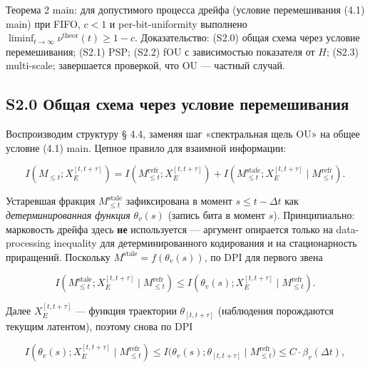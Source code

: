 \documentclass[12pt]{iopart}
\begin{document}
Теорема 2 main: для допустимого процесса дрейфа (условие перемешивания (4.1) main) при FIFO, \(c < 1\) и per-bit-uniformity выполнено \(\liminf_{t\to\infty}\nu^{\text{theor}}(t) \ge 1-c\). Доказательство: (S2.0) общая схема через условие перемешивания; (S2.1) PSP; (S2.2) fOU с зависимостью показателя от \(H\); (S2.3) multi-scale; завершается проверкой, что OU --- частный случай.



\subsection{S2.0 Общая схема через условие перемешивания}\label{s2.0-ux43eux431ux449ux430ux44f-ux441ux445ux435ux43cux430-ux447ux435ux440ux435ux437-ux443ux441ux43bux43eux432ux438ux435-ux43fux435ux440ux435ux43cux435ux448ux438ux432ux430ux43dux438ux44f}



Воспроизводим структуру \cite{Andriishin2026b} § 4.4, заменяя шаг «спектральная щель OU» на общее условие (4.1) main. Цепное правило для взаимной информации:



\begin{equation}I(M_{\le t}; X_E^{[t,t+\tau]}) = I(M_{\le t}^{\text{refr}}; X_E^{[t,t+\tau]}) + I(M_{\le t}^{\text{stale}}; X_E^{[t,t+\tau]}\mid M_{\le t}^{\text{refr}}). \tag{S2.1}\end{equation}



Устаревшая фракция \(M_{\le t}^{\text{stale}}\) зафиксирована в момент \(s \le t-\Delta t\) как \emph{детерминированная функция} \(\theta_v(s)\) (запись бита в момент \(s\)). Принципиально: марковость дрейфа здесь \textbf{не} используется --- аргумент опирается только на data-processing inequality для детерминированного кодирования и на стационарность приращений. Поскольку \(M^{\text{stale}} = f(\theta_v(s))\), по DPI для первого звена



\[I(M_{\le t}^{\text{stale}}; X_E^{[t,t+\tau]}\mid M_{\le t}^{\text{refr}}) \le I(\theta_v(s); X_E^{[t,t+\tau]}\mid M_{\le t}^{\text{refr}}).\]



Далее \(X_E^{[t,t+\tau]}\) --- функция траектории \(\theta_{[t,t+\tau]}\) (наблюдения порождаются текущим латентом), поэтому снова по DPI



\begin{equation}I(\theta_v(s); X_E^{[t,t+\tau]}\mid M_{\le t}^{\text{refr}}) \le I\big(\theta_v(s); \theta_{[t,t+\tau]}\mid M_{\le t}^{\text{refr}}\big) \le C\cdot\beta_v(\Delta t), \tag{S2.2}\end{equation}
\end{document}
